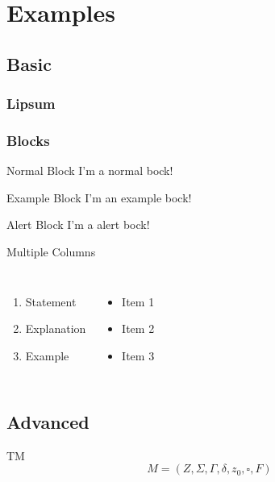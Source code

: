 \section{Examples}
\subsection{Basic}

\begin{frame}
	\frametitle{Lipsum}
	\centering
	\lipsum[1]
\end{frame}

\begin{frame}
	\frametitle{Blocks}
	\begin{block}{Normal Block}
		I'm a normal bock!
	\end{block}
	\begin{exampleblock}{Example Block}
		I'm an example bock!
	\end{exampleblock}
	\begin{alertblock}{Alert Block}
		I'm a alert bock!
	\end{alertblock}
\end{frame}

\begin{frame}{Multiple Columns}
    \begin{columns}[c]
        \begin{enumerate}
            \item Statement
            \item Explanation
            \item Example
        \end{enumerate}

        \begin{itemize}
			\item Item 1
			\item Item 2
			\item Item 3
		\end{itemize}

    \end{columns}
\end{frame}

\subsection{Advanced}

\begin{frame}{TM}
	$$M = (Z,\Sigma,\Gamma,\delta,z_0,\square,F)$$
\end{frame}

